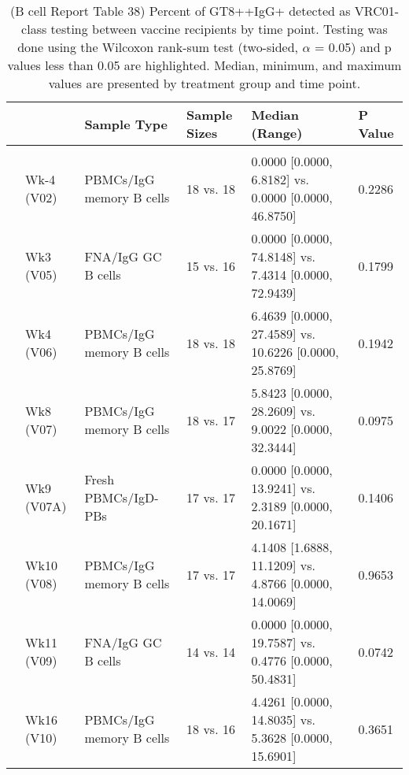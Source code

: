 \documentclass[
]{article}
\author{}
\date{\vspace{-2.5em}}
\begin{document}
\begin{table}[!h]

\caption[ (B cell Report Table 38) Percent of GT8++IgG+ detected as VRC01-class testing between vaccine recipients by time point]{\label{tab:bcell-tab-38} (B cell Report Table 38) Percent of GT8++IgG+ detected as VRC01-class testing between vaccine recipients by time point. Testing was done using the Wilcoxon rank-sum test (two-sided, $\alpha$ = 0.05) and p values less than 0.05 are highlighted. Median, minimum, and maximum values are presented by treatment group and time point.}
\centering
\fontsize{8}{10}\selectfont
\begin{tabular}[t]{llllll}
\toprule
 &  & Sample Type & Sample Sizes & Median (Range) & P Value\\
\midrule
\addlinespace[0.3em]
\multicolumn{6}{l}{\textbf{20µg vs. 100µg}}\\
\hspace{1em} & Wk-4 (V02) & PBMCs/IgG memory B cells & 18 vs. 18 & 0.0000 [0.0000, 6.8182] vs. 0.0000 [0.0000, 46.8750] & 0.2286\\
\cmidrule{2-6}
\hspace{1em} & Wk3 (V05) & FNA/IgG GC B cells & 15 vs. 16 & 0.0000 [0.0000, 74.8148] vs. 7.4314 [0.0000, 72.9439] & 0.1799\\
\cmidrule{2-6}
\hspace{1em} & Wk4 (V06) & PBMCs/IgG memory B cells & 18 vs. 18 & 6.4639 [0.0000, 27.4589] vs. 10.6226 [0.0000, 25.8769] & 0.1942\\
\cmidrule{2-6}
\hspace{1em} & Wk8 (V07) & PBMCs/IgG memory B cells & 18 vs. 17 & 5.8423 [0.0000, 28.2609] vs. 9.0022 [0.0000, 32.3444] & 0.0975\\
\cmidrule{2-6}
\hspace{1em} & Wk9 (V07A) & Fresh PBMCs/IgD- PBs & 17 vs. 17 & 0.0000 [0.0000, 13.9241] vs. 2.3189 [0.0000, 20.1671] & 0.1406\\
\cmidrule{2-6}
\hspace{1em} & Wk10 (V08) & PBMCs/IgG memory B cells & 17 vs. 17 & 4.1408 [1.6888, 11.1209] vs. 4.8766 [0.0000, 14.0069] & 0.9653\\
\cmidrule{2-6}
\hspace{1em} & Wk11 (V09) & FNA/IgG GC B cells & 14 vs. 14 & 0.0000 [0.0000, 19.7587] vs. 0.4776 [0.0000, 50.4831] & 0.0742\\
\cmidrule{2-6}
\hspace{1em} & Wk16 (V10) & PBMCs/IgG memory B cells & 18 vs. 16 & 4.4261 [0.0000, 14.8035] vs. 5.3628 [0.0000, 15.6901] & 0.3651\\
\bottomrule
\end{tabular}
\end{table}
\end{document}
